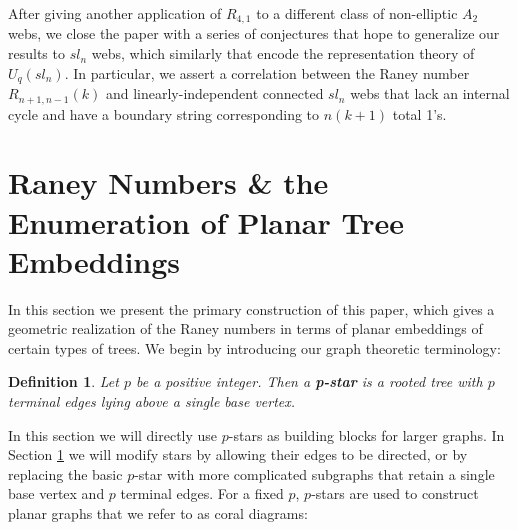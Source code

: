 \documentclass[documentfleqn,12pt]{amsart}
\newtheorem{definition}[theorem]{Definition}
\begin{document}
After giving another application of $R_{4,1}$ to a different class of non-elliptic $A_2$ webs, we close the paper with a series of conjectures that hope to generalize our results to $sl_n$ webs, which similarly that encode the representation theory of $U_q(sl_n)$.  In particular, we assert a correlation between the Raney number $R_{n+1,n-1}(k)$ and linearly-independent connected $sl_n$ webs that lack an internal cycle and have a boundary string corresponding to $n(k+1)$ total 1's.

\section{Raney Numbers \& the Enumeration of Planar Tree Embeddings}
\label{sec: primary results}

In this section we present the primary construction of this paper, which gives a geometric realization of the Raney numbers in terms of planar embeddings of certain types of trees.  We begin by introducing our graph theoretic terminology:

\begin{definition}
\label{def: star}
Let $p$ be a positive integer.  Then a \textbf{p-star} is a rooted tree with $p$ terminal edges lying above a single base vertex.
\end{definition}


In this section we will directly use $p$-stars as building blocks for larger graphs.  In Section \ref{sec: primary results} we will modify stars by allowing their edges to be directed, or by replacing the basic $p$-star with more complicated subgraphs that retain a single base vertex and $p$ terminal edges.  For a fixed $p$, $p$-stars are used to construct planar graphs that we refer to as coral diagrams:
\end{document}
